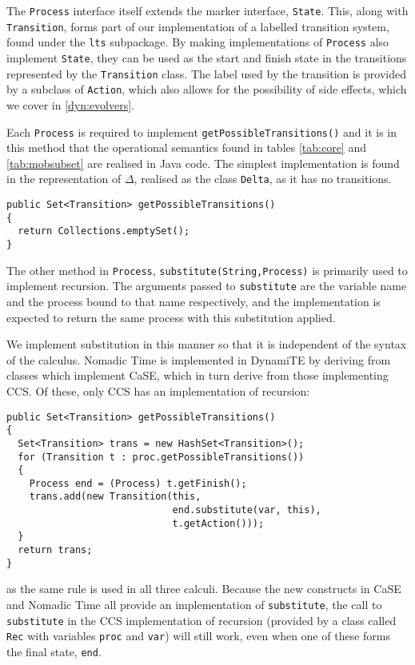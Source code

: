 The \texttt{Process} interface itself extends the marker interface,
\texttt{State}.  This, along with \texttt{Transition}, forms part of
our implementation of a labelled transition system, found under the
\texttt{lts} subpackage.  By making implementations of
\texttt{Process} also implement \texttt{State}, they can be used as
the start and finish state in the transitions represented by the
\texttt{Transition} class.  The label used by the transition is
provided by a subclass of \texttt{Action}, which also allows for the
possibility of side effects, which we cover in \ref{dyn:evolvers}.

Each \texttt{Process} is required to implement
\texttt{getPossibleTransitions()} and it is in this method that the
operational semantics found in tables \ref{tab:core} and
\ref{tab:mobsubset} are realised in Java code.  The simplest
implementation is found in the representation of $\Delta$, realised as
the class \texttt{Delta}, as it has no transitions.

\begin{verbatim}
public Set<Transition> getPossibleTransitions()
{
  return Collections.emptySet();
}
\end{verbatim}

The other method in \texttt{Process},
\texttt{substitute(String,Process)} is primarily used to implement
recursion.  The arguments passed to \texttt{substitute} are the
variable name and the process bound to that name respectively, and the
implementation is expected to return the same process with this
substitution applied.

We implement substitution in this manner so that it is independent of
the syntax of the calculus.  Nomadic Time is implemented in DynamiTE
by deriving from classes which implement CaSE, which in turn derive
from those implementing CCS.  Of these, only CCS has an implementation
of recursion:

\begin{verbatim}
public Set<Transition> getPossibleTransitions()
{
  Set<Transition> trans = new HashSet<Transition>();
  for (Transition t : proc.getPossibleTransitions())
  {
    Process end = (Process) t.getFinish();
    trans.add(new Transition(this,
                             end.substitute(var, this),
                             t.getAction()));
  }
  return trans;
}
\end{verbatim}

\noindent as the same rule is used in all three calculi.  Because the
new constructs in CaSE and Nomadic Time all provide an implementation
of \texttt{substitute}, the call to \texttt{substitute} in the CCS
implementation of recursion (provided by a class called \texttt{Rec}
with variables \texttt{proc} and \texttt{var}) will still work, even
when one of these forms the final state, \texttt{end}.

